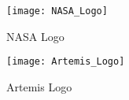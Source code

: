 \begin{minipage}[c]{0.5\textwidth}
   \begin{figure}[H]
      \centering
      \texttt{[image: NASA\_Logo]}
      \caption{NASA Logo} 
      \label{fig:nasa-logo}
   \end{figure}
\end{minipage}%
\begin{minipage}[c]{0.5\textwidth}
   \begin{figure}[H]
      \centering
      \texttt{[image: Artemis\_Logo]}
      \caption{Artemis Logo} 
      \label{fig:artemis-logo}
   \end{figure}
\end{minipage}